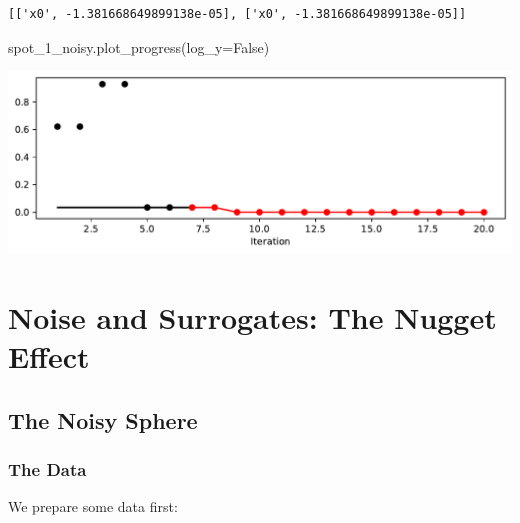 \documentclass[
  letterpaper,
  DIV=11,
  numbers=noendperiod]{scrreprt}
\newenvironment{Shaded}{\begin{snugshade}}{\end{snugshade}}
\newcommand{\NormalTok}[1]{\textcolor[rgb]{0.00,0.23,0.31}{#1}}
\newcommand{\OperatorTok}[1]{\textcolor[rgb]{0.37,0.37,0.37}{#1}}
\newcommand{\VariableTok}[1]{\textcolor[rgb]{0.07,0.07,0.07}{#1}}
\begin{document}
\begin{verbatim}
[['x0', -1.381668649899138e-05], ['x0', -1.381668649899138e-05]]
\end{verbatim}

\begin{Shaded}
\begin{Highlighting}[]
\NormalTok{spot\_1\_noisy.plot\_progress(log\_y}\OperatorTok{=}\VariableTok{False}\NormalTok{)}
\end{Highlighting}
\end{Shaded}

\includegraphics{014_num_spot_ocba_files/figure-pdf/cell-8-output-1.pdf}

\section{Noise and Surrogates: The Nugget
Effect}\label{noise-and-surrogates-the-nugget-effect-1}

\subsection{The Noisy Sphere}\label{the-noisy-sphere-1}

\subsubsection{The Data}\label{the-data-1}

We prepare some data first:
\end{document}
